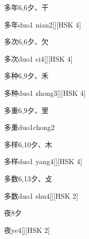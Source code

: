 \begin{entry}{多年}{6,6}{⼣、⼲}
  \begin{phonetics}{多年}{duo1 nian2}[][HSK 4]
  \end{phonetics}
\end{entry}

\begin{entry}{多次}{6,6}{⼣、⽋}
  \begin{phonetics}{多次}{duo1 ci4}[][HSK 4]
  \end{phonetics}
\end{entry}

\begin{entry}{多种}{6,9}{⼣、⽲}
  \begin{phonetics}{多种}{duo1 zhong3}[][HSK 4]
  \end{phonetics}
\end{entry}

\begin{entry}{多重}{6,9}{⼣、⾥}
  \begin{phonetics}{多重}{duo1chong2}
  \end{phonetics}
\end{entry}

\begin{entry}{多样}{6,10}{⼣、⽊}
  \begin{phonetics}{多样}{duo1 yang4}[][HSK 4]
  \end{phonetics}
\end{entry}

\begin{entry}{多数}{6,13}{⼣、⽁}
  \begin{phonetics}{多数}{duo1 shu4}[][HSK 2]
  \end{phonetics}
\end{entry}

\begin{entry}{夜}{8}{⼣}
  \begin{phonetics}{夜}{ye4}[][HSK 2]
  \end{phonetics}
\end{entry}

